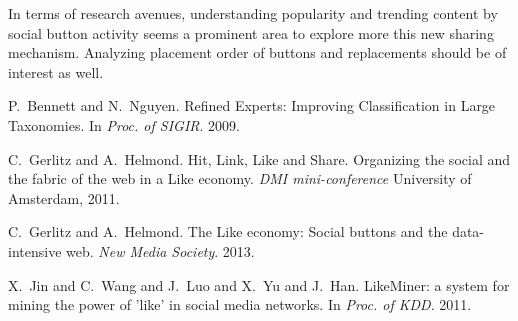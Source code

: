 \documentclass{sig-alternate}
\begin{document}
In terms of research avenues, understanding popularity and trending content by social button activity seems a prominent area to explore more this new sharing mechanism. Analyzing placement order of buttons and replacements should be of interest as well.


\begin{thebibliography}{99}

\newblock P.~Bennett and N.~Nguyen. 
\newblock Refined Experts: Improving Classification in Large Taxonomies. In \emph{Proc. of SIGIR}. 2009. 

\newblock C.~Gerlitz and A.~Helmond. 
\newblock Hit, Link, Like and Share. Organizing the social and the fabric of the web in a Like economy. \emph{DMI mini-conference} University of Amsterdam, 2011.

\newblock C.~Gerlitz and A.~Helmond. 
\newblock The Like economy: Social buttons and the data-intensive web. \emph{New Media Society}. 2013.

\newblock X.~Jin and C.~Wang and J.~Luo and X.~Yu and J.~Han.
\newblock LikeMiner: a system for mining the power of 'like' in social media networks. In \emph{Proc. of KDD}. 2011.

\end{thebibliography}
\end{document}

